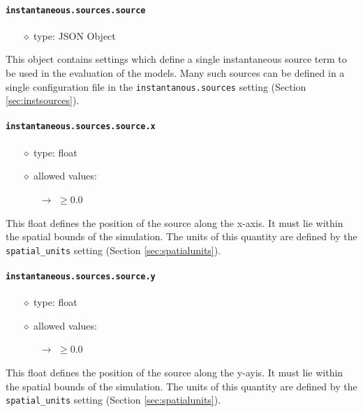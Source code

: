 \documentclass[]{article}
\def\code#1{\texttt{#1}}
\begin{document}
\paragraph{\code{instantaneous.sources.source}}\label{sec:instsource}
\begin{itemize}
    \item[$\diamond$] type: JSON Object 
\end{itemize}
This object contains settings which define a single instantaneous source term to
be used in the evaluation of the models. Many such sources can be defined in a
single configuration file in the \code{instantanous.sources} setting (Section
\ref{sec:instsources}).

\paragraph{\code{instantaneous.sources.source.x}}\label{sec:instsourcex}
\begin{itemize}
    \item[$\diamond$] type: float 
    \item[$\diamond$] allowed values:
    \begin{itemize}
        \item[$\rightarrow$] $\geq0.0$
    \end{itemize}
\end{itemize}
This float defines the position of the source along the x-axis. It must lie
within the spatial bounds of the simulation. The units of this quantity are
defined by the \code{spatial\_units} setting (Section \ref{sec:spatialunits}).

\paragraph{\code{instantaneous.sources.source.y}}\label{sec:instsourcey}
\begin{itemize}
    \item[$\diamond$] type: float 
    \item[$\diamond$] allowed values:
    \begin{itemize}
        \item[$\rightarrow$] $\geq0.0$
    \end{itemize}
\end{itemize}
This float defines the position of the source along the y-ayis. It must lie
within the spatial bounds of the simulation. The units of this quantity are
defined by the \code{spatial\_units} setting (Section \ref{sec:spatialunits}).
\end{document}
